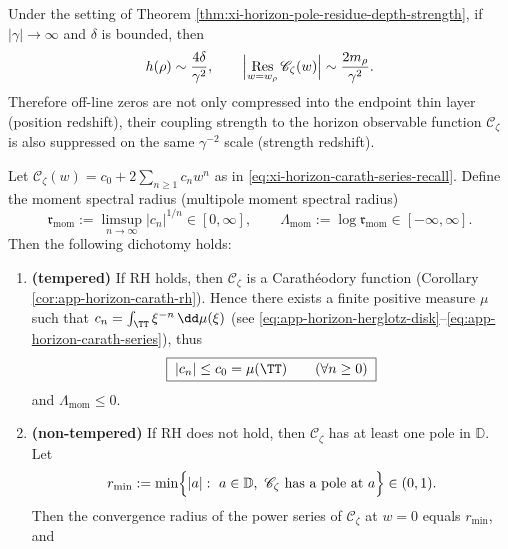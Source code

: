 \begin{corollary}\label{cor:xi-horizon-residue-redshift}
Under the setting of Theorem \ref{thm:xi-horizon-pole-residue-depth-strength}, if \(|\gamma|\to\infty\) and \(\delta\) is bounded, then
\[
h(\rho)\sim \frac{4\delta}{\gamma^2},
\qquad
\Bigl|\operatorname*{Res}_{w=w_{\rho}}\mathscr{C}_{\zeta}(w)\Bigr|\sim \frac{2m_{\rho}}{\gamma^2}.
\]
Therefore off-line zeros are not only compressed into the endpoint thin layer (position redshift), their coupling strength to the horizon observable function \(\mathscr{C}_{\zeta}\) is also suppressed on the same \(\gamma^{-2}\) scale (strength redshift).
\end{corollary}

\begin{theorem}\label{thm:xi-horizon-multipole-temperedness-dichotomy}
Let \(\mathscr{C}_{\zeta}(w)=c_0+2\sum_{n\ge 1}c_n w^n\) as in \eqref{eq:xi-horizon-carath-series-recall}.
Define the moment spectral radius (multipole moment spectral radius)
\[
\mathfrak{r}_{\mathrm{mom}}
:=\limsup_{n\to\infty}|c_n|^{1/n}\in[0,\infty],
\qquad
\Lambda_{\mathrm{mom}}:=\log \mathfrak{r}_{\mathrm{mom}}\in[-\infty,\infty].
\]
Then the following dichotomy holds:
\begin{enumerate}
  \item \textbf{(tempered)} If RH holds, then \(\mathscr{C}_{\zeta}\) is a Carath\'eodory function (Corollary \ref{cor:app-horizon-carath-rh}).
  Hence there exists a finite positive measure \(\mu\) such that \(c_n=\int_{\TT}\xi^{-n}\,\dd\mu(\xi)\) (see \eqref{eq:app-horizon-herglotz-disk}--\eqref{eq:app-horizon-carath-series}), thus
  \begin{equation}\label{eq:xi-horizon-cn-bounded}
  \boxed{\;
  |c_n|\le c_0=\mu(\TT)\qquad(\forall n\ge 0)\;}
  \end{equation}
  and \(\Lambda_{\mathrm{mom}}\le 0\).
  \item \textbf{(non-tempered)} If RH does not hold, then \(\mathscr{C}_{\zeta}\) has at least one pole in \(\mathbb{D}\).
  Let
  \begin{equation}\label{eq:xi-horizon-rmin-pole}
  r_{\min}:=\min\Bigl\{|a|:\ a\in\mathbb{D},\ \mathscr{C}_{\zeta}\ \text{has a pole at}\ a\Bigr\}\in(0,1).
  \end{equation}
  Then the convergence radius of the power series of \(\mathscr{C}_{\zeta}\) at \(w=0\) equals \(r_{\min}\), and
  \begin{equation}\label{eq:xi-horizon-moment-spectral-radius}

\end{equation}
\end{enumerate}
\end{theorem}
